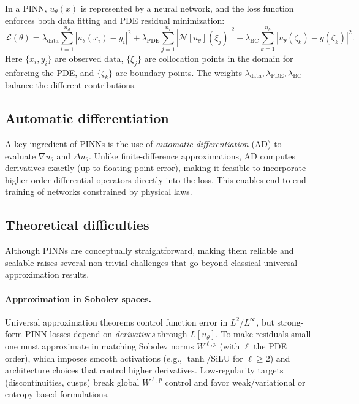 \documentclass[superscriptaddress,unsortedaddress,amsmath,amssymb,aps]{revtex4-2}
\begin{document}
In a PINN, $u_\theta(x)$ is represented by a neural network, 
and the loss function enforces both data fitting and PDE residual minimization:
\begin{equation}
  \mathcal{L}(\theta) = 
  \lambda_\text{data} \sum_{i=1}^{n_d} |u_\theta(x_i)-y_i|^2
  + \lambda_\text{PDE} \sum_{j=1}^{n_r} |\mathcal{N}[u_\theta](\xi_j)|^2
  + \lambda_\text{BC} \sum_{k=1}^{n_b} |u_\theta(\zeta_k)-g(\zeta_k)|^2.
\end{equation}
Here $\{x_i,y_i\}$ are observed data, $\{\xi_j\}$ are collocation points in 
the domain for enforcing the PDE, and $\{\zeta_k\}$ are boundary points.  
The weights $\lambda_\text{data}, \lambda_\text{PDE}, \lambda_\text{BC}$ 
balance the different contributions.  

\subsection{Automatic differentiation}
A key ingredient of PINNs is the use of \emph{automatic differentiation} (AD) 
to evaluate $\nabla u_\theta$ and $\Delta u_\theta$. Unlike finite-difference 
approximations, AD computes derivatives exactly (up to floating-point error), 
making it feasible to incorporate higher-order differential operators directly 
into the loss. This enables end-to-end training of networks constrained by 
physical laws.  

\subsection{Theoretical difficulties}
Although PINNs are conceptually straightforward, making them reliable and scalable raises several non-trivial challenges that go beyond classical universal approximation results.

\paragraph{Approximation in Sobolev spaces.}
Universal approximation theorems control function error in $L^2$/$L^\infty$, but strong-form PINN losses depend on \emph{derivatives} through $L[u_\theta]$. 
To make residuals small one must approximate in matching Sobolev norms $W^{\ell,p}$ (with $\ell$ the PDE order), which imposes smooth activations (e.g., $\tanh$/SiLU for $\ell\!\ge\!2$) and architecture choices that control higher derivatives. 
Low-regularity targets (discontinuities, cusps) break global $W^{\ell,p}$ control and favor weak/variational or entropy-based formulations.
\end{document}
